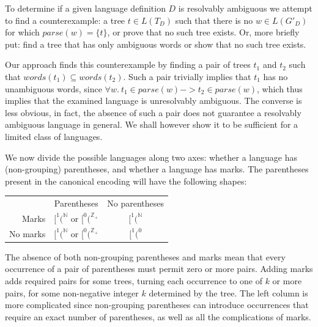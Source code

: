 \documentclass[runningheads]{llncs}
\newcommand{\parse}{\mathit{parse}} %
\newcommand{\words}{\mathit{words}} %
\newcommand{\reqpl}{(}
\newcommand{\pospl}{[}
\begin{document}
To determine if a given language definition $D$ is resolvably ambiguous we attempt to find a counterexample: a tree $t \in L(T_D)$ such that there is no $w \in L(G'_D)$ for which $\parse(w) = \{t\}$, or prove that no such tree exists. Or, more briefly put: find a tree that has only ambiguous words or show that no such tree exists.

Our approach finds this counterexample by finding a pair of trees $t_1$ and $t_2$ such that $\words(t_1) \subseteq \words(t_2)$. Such a pair trivially implies that $t_1$ has no unambiguous words, since $\forall w.\ t_1 \in \parse(w) -> t_2 \in \parse(w)$, which thus implies that the examined language is unresolvably ambiguous. The converse is less obvious, in fact, the absence of such a pair does not guarantee a resolvably ambiguous language in general. We shall however show it to be sufficient for a limited class of languages.

We now divide the possible languages along two axes: whether a language has (non-grouping) parentheses, and whether a language has marks. The parentheses present in the canonical encoding will have the following shapes:

\begin{center}
\begin{tabular}{r@{\quad}c@{\quad}c}
  & Parentheses & No parentheses \\
  \addlinespace
  Marks & $\pospl^1\reqpl^{\mathbb{N}}$ or $\pospl^0\reqpl^{\mathbb{Z}_{+}}$ & $\pospl^1\reqpl^{\mathbb{N}}$ \\
  No marks & $\pospl^1\reqpl^{\mathbb{N}}$ or $\pospl^0\reqpl^{\mathbb{Z}_{+}}$ & $\pospl^1\reqpl^0$ \\
\end{tabular}
\end{center}

\noindent The absence of both non-grouping parentheses and marks mean that every occurrence of a pair of parentheses must permit zero or more pairs. Adding marks adds required pairs for some trees, turning each occurrence to one of $k$ or more pairs, for some non-negative integer $k$ determined by the tree. The left column is more complicated since non-grouping parentheses can introduce occurrences that require an exact number of parentheses, as well as all the complications of marks.
\end{document}
